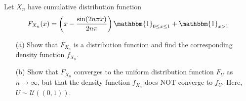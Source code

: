 \begin{problem}[Exercise 3.6]
    Let \( X_n \) have cumulative distribution function
    \begin{align*}
        F_{X_n}(x)=\left(x-\dfrac{\sin(2n\pi x)}{2n\pi}\right)\mathbbm{1}_{0\leq x\leq 1}+\mathbbm{1}_{x>1}
    \end{align*}
    \begin{enumerate}
        \item[(a)] Show that \( F_{X_n} \) is a distribution function and find the corresponding density function \( f_{X_n} \).
        \item[(b)] Show that \( F_{X_n} \) converges to the uniform distribution function \( F_U \) as \( n \to\infty \), but that the density function \( f_{X_n} \) does NOT converge to \( f_U \). Here, \( U\sim \mathcal{U}((0,1)) \).
    \end{enumerate}
\end{problem}

